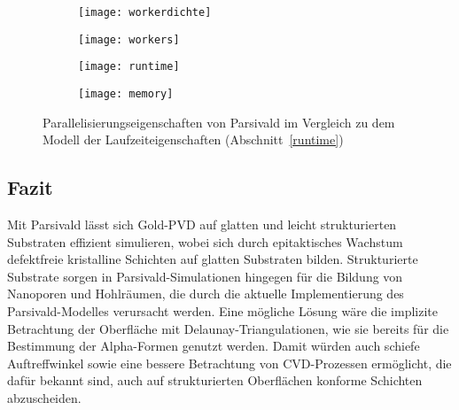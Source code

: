 \begin{figure}[t]
  \centering
  \captionsetup[subfigure]{singlelinecheck=false}
  \def\subfigwidth{7cm}
  \begin{subfigure}[t]{\subfigwidth}
    \texttt{[image: workerdichte]}
    \label{fig:goldscala-density}
  \end{subfigure}
  \hfill
  \begin{subfigure}[t]{\subfigwidth}
    \texttt{[image: workers]}
    \label{fig:goldscala-workers}
  \end{subfigure}

  \vspace{1em}

  \begin{subfigure}[t]{\subfigwidth}
    \texttt{[image: runtime]}
    \label{fig:goldscala-runtime}
  \end{subfigure}
  \hfill
  \begin{subfigure}[t]{\subfigwidth}
    \texttt{[image: memory]}
    \label{fig:goldscala-memory}
  \end{subfigure}
  \caption{Parallelisierungseigenschaften von Parsivald im Vergleich zu dem Modell der Laufzeiteigenschaften (Abschnitt~\ref{runtime})}
  \label{fig:goldscala}
\end{figure}

\subsection{Fazit}

Mit Parsivald lässt sich Gold-PVD auf glatten und leicht strukturierten Substraten effizient simulieren, wobei sich durch epitaktisches Wachstum defektfreie kristalline Schichten auf glatten Substraten bilden.
Strukturierte Substrate sorgen in Parsivald-Simulationen hingegen für die Bildung von Nanoporen und Hohlräumen, die durch die aktuelle Implementierung des Parsivald-Modelles verursacht werden.
Eine mögliche Lösung wäre die implizite Betrachtung der Oberfläche mit Delaunay-Triangulationen, wie sie bereits für die Bestimmung der Alpha-Formen genutzt werden.
Damit würden auch schiefe Auftreffwinkel sowie eine bessere Betrachtung von CVD-Prozessen ermöglicht, die dafür bekannt sind, auch auf strukturierten Oberflächen konforme Schichten abzuscheiden\cite{granneman_thin_1993}.
